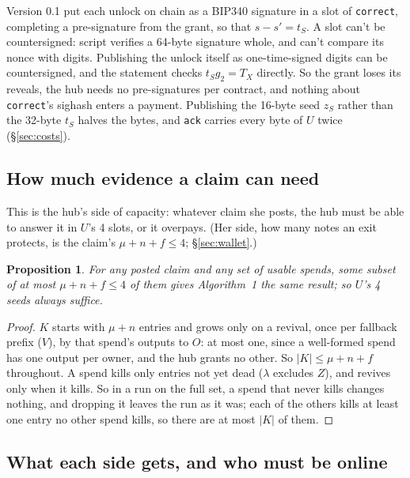 \documentclass[11pt]{article}
\theoremstyle{plain}
\newtheorem{proposition}{Proposition}
\theoremstyle{definition}
\newcommand{\tx}[1]{\texttt{#1}}
\begin{document}
Version 0.1 put each unlock on chain as a BIP340 signature in a slot of
\tx{correct}, completing a pre-signature from the grant, so that $s - s'
= t_S$. A slot can't be countersigned: script verifies a 64-byte
signature whole, and can't compare its nonce with digits. Publishing
the unlock itself as one-time-signed digits can be countersigned, and
the statement checks $t_S g_2 = T_X$ directly. So the grant loses its
reveals, the hub needs no pre-signatures per contract, and nothing
about \tx{correct}'s sighash enters a payment. Publishing the 16-byte
seed $z_S$ rather than the 32-byte $t_S$ halves the bytes, and \tx{ack}
carries every byte of $U$ twice (\S\ref{sec:costs}).

\subsection{How much evidence a claim can need}\label{sec:volume}

This is the hub's side of capacity: whatever claim she posts, the hub
must be able to answer it in $U$'s 4 slots, or it overpays. (Her side,
how many notes an exit protects, is the claim's $\mu + n + f \le 4$;
\S\ref{sec:wallet}.)

\begin{proposition}\label{prop:volume}
For any posted claim and any set of usable spends, some subset of at
most $\mu + n + f \le 4$ of them gives Algorithm~1 the same result; so
$U$'s 4 seeds always suffice.
\end{proposition}
\begin{proof}
$K$ starts with $\mu + n$ entries and grows only on a revival, once per
fallback prefix ($V$), by that spend's outputs to $O$: at most one, since
a well-formed spend has one output per owner, and the hub grants no
other. So $|K| \le \mu + n + f$ throughout. A spend kills only entries
not yet dead ($\lambda$ excludes $Z$), and revives only when it kills.
So in a run on the full set, a spend that never kills changes nothing,
and dropping it leaves the run as it was; each of the others kills at
least one entry no other spend kills, so there are at most $|K|$ of
them.
\end{proof}

\subsection{What each side gets, and who must be online}\label{sec:who}
\end{document}
